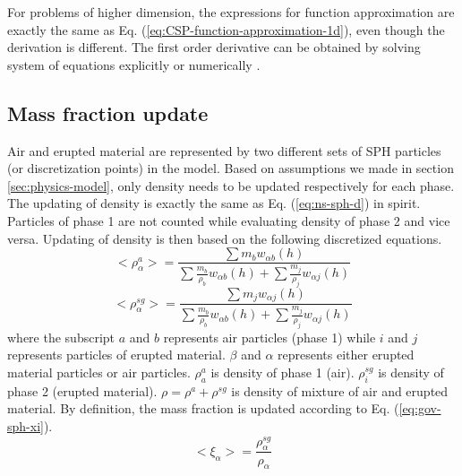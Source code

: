 \documentclass[gmd, manuscript]{copernicus}
\begin{document}
For problems of higher dimension, the expressions for function approximation are exactly the same as Eq. (\ref{eq:CSP-function-approximation-1d}), even though the derivation is different. The first order derivative can be obtained by solving system of equations explicitly or numerically \citep{chen1999improvement}.

\subsection{Mass fraction update}
Air and erupted material are represented by two different sets of SPH particles (or discretization points) in the model. Based on assumptions we made in section \ref{sec:physics-model}, only density needs to be updated respectively for each phase. The updating of density is exactly the same as Eq. (\ref{eq:ns-sph-d}) in spirit.  Particles of phase 1 are not counted while evaluating density of phase 2 and vice versa. Updating of density is then based on the following discretized equations.
\begin{equation}
<\rho_{\alpha}^a>=\frac{\sum m_b w_{\alpha b} \left(h\right)}{\sum \frac{m_b}{\rho_b} w_{\alpha b} \left(h\right) +\sum \frac{m_j}{\rho_j} w_{\alpha j} \left(h\right)} \label{eq:gov-sph-d1}
\end{equation}
\begin{equation}
<\rho_\alpha^{sg}>=\frac{\sum m_j w_{\alpha j} \left(h\right)}{\sum \frac{m_b}{\rho_b} w_{\alpha b} \left(h\right) +\sum \frac{m_j}{\rho_j} w_{\alpha j} \left(h\right)} \label{eq:gov-sph-d2}
\end{equation}
where the subscript $a$ and $b$ represents air particles (phase 1) while $i$ and $j$ represents particles of erupted material. $\beta$ and $\alpha$ represents either erupted material particles or air particles.
$\rho_a^a$ is density of phase 1 (air). 
 $\rho_i^{sg}$ is density of phase 2 (erupted material).
$\rho=\rho^a + \rho^{sg}$ is density of mixture of air and erupted material. 
By definition, the mass fraction is updated according to Eq. (\ref{eq:gov-sph-xi}).
\begin{equation}
<\xi_{\alpha}> = \dfrac{\rho^{sg}_{\alpha}}{\rho_{\alpha}}
\label{eq:gov-sph-xi}
\end{equation}
\end{document}
